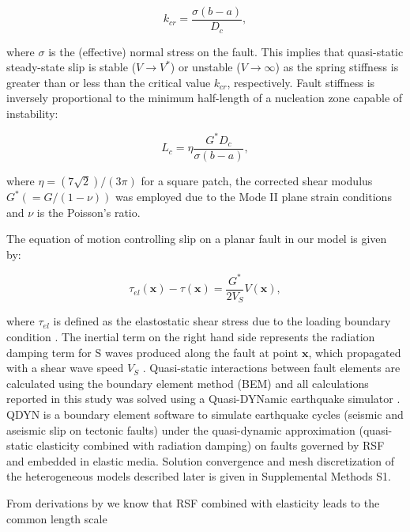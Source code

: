 \documentclass[draft]{agujournal2019}
\begin{document}
\begin{equation}
\label{eq9}
k_{cr}=\frac{\sigma \left( b-a \right)}{D_{c}},
\end{equation}   

\noindent where $\sigma$ is the (effective) normal stress on the fault. This implies that quasi-static steady-state slip is stable ($V \rightarrow V^{*}$) or unstable ($V \rightarrow \infty$) as the spring stiffness is greater than or less than the critical value $k_{cr}$, respectively. Fault stiffness is inversely proportional to the minimum half-length of a nucleation zone capable of instability:

\begin{equation}
\label{eq8}
L_{c} = \eta \frac{G^{*} D_{c}}{ \sigma \left( b-a\right)},
\end{equation}   

\noindent where $\eta = (7\sqrt{2})/(3\pi)$ \cite{Dieterich1992} for a square patch, the corrected shear modulus $G^{*} (= G/(1-\nu))$ was employed due to the Mode II plane strain conditions and $\nu$ is the Poisson's ratio. 

The equation of motion controlling slip on a planar fault in our model is given by:

\begin{equation}
\label{eq8a}
\tau_{el}\left( \mathbf{x} \right) - \tau\left( \mathbf{x} \right) = \frac{G^{*}}{2 V_{S}} V(\mathbf{x}),
\end{equation}  

\noindent where $\tau_{el}$ is defined as the elastostatic shear stress due to the loading boundary condition \cite{Horowitz1989}. The inertial term on the right hand side represents the radiation damping term for S waves produced along the fault at point $\mathbf{x}$, which propagated with a shear wave speed $V_{S}$ \cite{Rice1993}. Quasi-static interactions between fault elements are calculated using the boundary element method (BEM) and all calculations reported in this study was solved using a Quasi-DYNamic earthquake simulator \cite{Luo2017}. QDYN is a boundary element software to simulate earthquake cycles (seismic and aseismic slip on tectonic faults) under the quasi-dynamic approximation (quasi-static elasticity combined with radiation damping) on faults governed by RSF and embedded in elastic media.  Solution convergence and mesh discretization of the heterogeneous models described later is given in Supplemental Methods S1.

From derivations by  we know that RSF combined with elasticity leads to the common length scale
\end{document}
